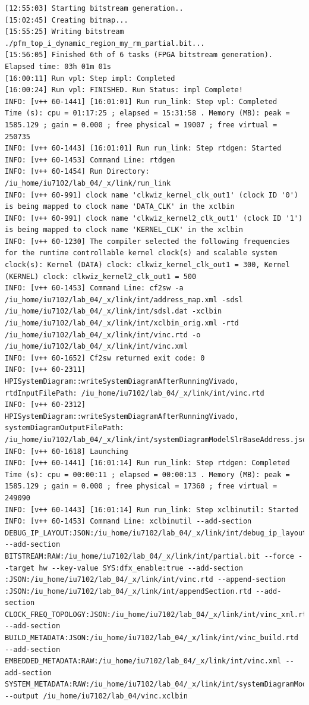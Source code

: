 \begin{lstlisting}[label=code, basicstyle=\tiny, caption=Листинг файла v++\_vinc.log]
[12:55:03] Starting bitstream generation..
[15:02:45] Creating bitmap...
[15:55:25] Writing bitstream ./pfm_top_i_dynamic_region_my_rm_partial.bit...
[15:56:05] Finished 6th of 6 tasks (FPGA bitstream generation). Elapsed time: 03h 01m 01s 
[16:00:11] Run vpl: Step impl: Completed
[16:00:24] Run vpl: FINISHED. Run Status: impl Complete!
INFO: [v++ 60-1441] [16:01:01] Run run_link: Step vpl: Completed
Time (s): cpu = 01:17:25 ; elapsed = 15:31:58 . Memory (MB): peak = 1585.129 ; gain = 0.000 ; free physical = 19007 ; free virtual = 250735
INFO: [v++ 60-1443] [16:01:01] Run run_link: Step rtdgen: Started
INFO: [v++ 60-1453] Command Line: rtdgen
INFO: [v++ 60-1454] Run Directory: /iu_home/iu7102/lab_04/_x/link/run_link
INFO: [v++ 60-991] clock name 'clkwiz_kernel_clk_out1' (clock ID '0') is being mapped to clock name 'DATA_CLK' in the xclbin
INFO: [v++ 60-991] clock name 'clkwiz_kernel2_clk_out1' (clock ID '1') is being mapped to clock name 'KERNEL_CLK' in the xclbin
INFO: [v++ 60-1230] The compiler selected the following frequencies for the runtime controllable kernel clock(s) and scalable system clock(s): Kernel (DATA) clock: clkwiz_kernel_clk_out1 = 300, Kernel (KERNEL) clock: clkwiz_kernel2_clk_out1 = 500
INFO: [v++ 60-1453] Command Line: cf2sw -a /iu_home/iu7102/lab_04/_x/link/int/address_map.xml -sdsl /iu_home/iu7102/lab_04/_x/link/int/sdsl.dat -xclbin /iu_home/iu7102/lab_04/_x/link/int/xclbin_orig.xml -rtd /iu_home/iu7102/lab_04/_x/link/int/vinc.rtd -o /iu_home/iu7102/lab_04/_x/link/int/vinc.xml
INFO: [v++ 60-1652] Cf2sw returned exit code: 0
INFO: [v++ 60-2311] HPISystemDiagram::writeSystemDiagramAfterRunningVivado, rtdInputFilePath: /iu_home/iu7102/lab_04/_x/link/int/vinc.rtd
INFO: [v++ 60-2312] HPISystemDiagram::writeSystemDiagramAfterRunningVivado, systemDiagramOutputFilePath: /iu_home/iu7102/lab_04/_x/link/int/systemDiagramModelSlrBaseAddress.json
INFO: [v++ 60-1618] Launching 
INFO: [v++ 60-1441] [16:01:14] Run run_link: Step rtdgen: Completed
Time (s): cpu = 00:00:11 ; elapsed = 00:00:13 . Memory (MB): peak = 1585.129 ; gain = 0.000 ; free physical = 17360 ; free virtual = 249090
INFO: [v++ 60-1443] [16:01:14] Run run_link: Step xclbinutil: Started
INFO: [v++ 60-1453] Command Line: xclbinutil --add-section DEBUG_IP_LAYOUT:JSON:/iu_home/iu7102/lab_04/_x/link/int/debug_ip_layout.rtd --add-section BITSTREAM:RAW:/iu_home/iu7102/lab_04/_x/link/int/partial.bit --force --target hw --key-value SYS:dfx_enable:true --add-section :JSON:/iu_home/iu7102/lab_04/_x/link/int/vinc.rtd --append-section :JSON:/iu_home/iu7102/lab_04/_x/link/int/appendSection.rtd --add-section CLOCK_FREQ_TOPOLOGY:JSON:/iu_home/iu7102/lab_04/_x/link/int/vinc_xml.rtd --add-section BUILD_METADATA:JSON:/iu_home/iu7102/lab_04/_x/link/int/vinc_build.rtd --add-section EMBEDDED_METADATA:RAW:/iu_home/iu7102/lab_04/_x/link/int/vinc.xml --add-section SYSTEM_METADATA:RAW:/iu_home/iu7102/lab_04/_x/link/int/systemDiagramModelSlrBaseAddress.json --output /iu_home/iu7102/lab_04/vinc.xclbin

\end{lstlisting}
